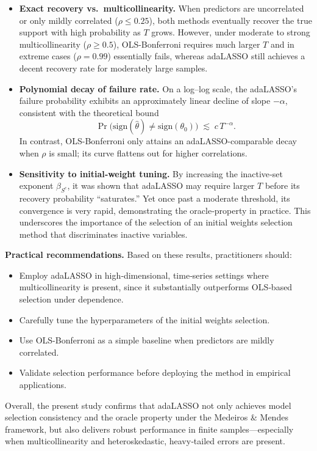 \documentclass[10pt,a4paper,oneside]{article}
\begin{document}
\begin{itemize}
  \item \textbf{Exact recovery vs.\ multicollinearity.}  When predictors are uncorrelated or only mildly correlated ($\rho\le0.25$), both methods eventually recover the true support with high probability as $T$ grows.  However, under moderate to strong multicollinearity ($\rho\ge0.5$), OLS-Bonferroni requires much larger $T$ and in extreme cases ($\rho=0.99$) essentially fails, whereas adaLASSO still achieves a decent recovery rate for moderately large samples.
  \item \textbf{Polynomial decay of failure rate.}  On a log–log scale, the adaLASSO’s failure probability exhibits an approximately linear decline of slope $-\alpha$, consistent with the theoretical bound
  \[
    \Pr\bigl(\mathrm{sign}(\hat\theta)\neq\mathrm{sign}(\theta_0)\bigr)\;\lesssim\;c\,T^{-\alpha}.
  \]
  In contrast, OLS-Bonferroni only attains an adaLASSO-comparable decay when $\rho$ is small; its curve flattens out for higher correlations.
  \item \textbf{Sensitivity to initial‐weight tuning.}  By increasing the inactive‐set exponent $\beta_{S^c}$, it was shown that adaLASSO may require larger $T$ before its recovery probability ``saturates.''  Yet once past a moderate threshold, its convergence is very rapid, demonstrating the oracle‐property in practice. This underscores the importance of the selection of an initial weights selection method that discriminates inactive variables.
\end{itemize}

\noindent
\textbf{Practical recommendations.}  Based on these results, practitioners should:
\begin{itemize}
  \item Employ adaLASSO in high‐dimensional, time‐series settings where multicollinearity is present, since it substantially outperforms OLS‐based selection under dependence.
  \item Carefully tune the hyperparameters of the initial weights selection.
  \item Use OLS-Bonferroni as a simple baseline when predictors are mildly correlated.
  \item Validate selection performance before deploying the method in empirical applications.
\end{itemize}

\noindent
Overall, the present study confirms that adaLASSO not only achieves model selection consistency and the oracle property under the Medeiros \& Mendes framework, but also delivers robust performance in finite samples—especially when multicollinearity and heteroskedastic, heavy‐tailed errors are present.
\end{document}
